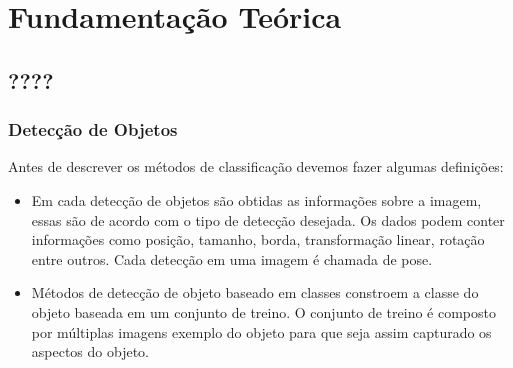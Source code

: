 \graphicspath{{figuras/}}
\chapter{Fundamentação Teórica} \label{Cap:Fundamentacao}


\section{????}
\subsection{Detecção de Objetos}
\label{Sec:TiposDeDeteccaoDeObjetos}
Antes de descrever os métodos de classificação devemos fazer algumas definições:
\begin{itemize}
	\item	Em cada detecção de objetos são obtidas as informações sobre a imagem, essas são de acordo com o tipo de detecção desejada. Os dados podem conter informações como posição, tamanho, borda, transformação linear, rotação entre outros. Cada detecção em uma imagem é chamada de pose.
	
	\item	Métodos de detecção de objeto baseado em classes constroem a classe do objeto baseada em um conjunto de treino. O conjunto de treino é composto por múltiplas imagens exemplo do objeto para que seja assim capturado os aspectos do objeto.
\end{itemize}

